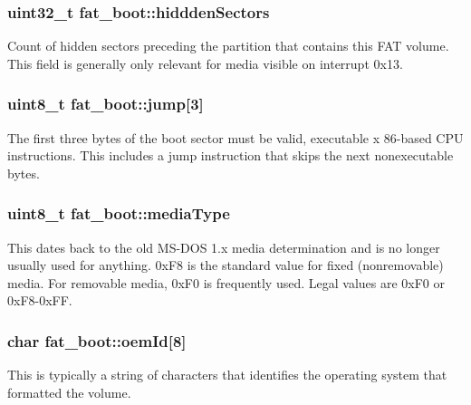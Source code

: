 \subsubsection[{\texorpdfstring{hiddden\+Sectors}{hidddenSectors}}]{\setlength{\rightskip}{0pt plus 5cm}uint32\+\_\+t fat\+\_\+boot\+::hiddden\+Sectors}\hypertarget{structfat__boot_a18f1b4c245fe7bd09f5a9430c005e23a}{}\label{structfat__boot_a18f1b4c245fe7bd09f5a9430c005e23a}
Count of hidden sectors preceding the partition that contains this F\+AT volume. This field is generally only relevant for media visible on interrupt 0x13. 
\subsubsection[{\texorpdfstring{jump}{jump}}]{\setlength{\rightskip}{0pt plus 5cm}uint8\+\_\+t fat\+\_\+boot\+::jump\mbox{[}3\mbox{]}}\hypertarget{structfat__boot_a83f9f2d1d0130f25f34c90dfc82e3751}{}\label{structfat__boot_a83f9f2d1d0130f25f34c90dfc82e3751}
The first three bytes of the boot sector must be valid, executable x 86-\/based C\+PU instructions. This includes a jump instruction that skips the next nonexecutable bytes. 
\subsubsection[{\texorpdfstring{media\+Type}{mediaType}}]{\setlength{\rightskip}{0pt plus 5cm}uint8\+\_\+t fat\+\_\+boot\+::media\+Type}\hypertarget{structfat__boot_a63eaf7185663369af2527309634d3c90}{}\label{structfat__boot_a63eaf7185663369af2527309634d3c90}
This dates back to the old M\+S-\/\+D\+OS 1.\+x media determination and is no longer usually used for anything. 0x\+F8 is the standard value for fixed (nonremovable) media. For removable media, 0x\+F0 is frequently used. Legal values are 0x\+F0 or 0x\+F8-\/0x\+FF. 
\subsubsection[{\texorpdfstring{oem\+Id}{oemId}}]{\setlength{\rightskip}{0pt plus 5cm}char fat\+\_\+boot\+::oem\+Id\mbox{[}8\mbox{]}}\hypertarget{structfat__boot_adc034212201e879fea1eb44db43e55a5}{}\label{structfat__boot_adc034212201e879fea1eb44db43e55a5}
This is typically a string of characters that identifies the operating system that formatted the volume. 
